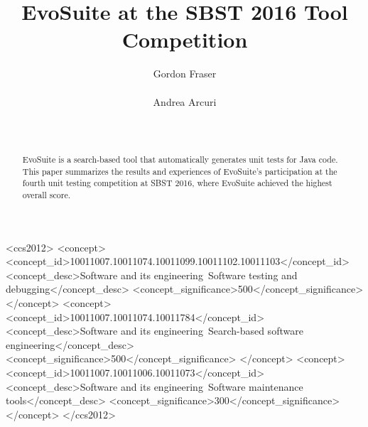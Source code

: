 \documentclass{sig-alternate}
\newcommand{\EVOSUITE}{{\sc EvoSuite}\xspace}
\begin{document}
% 

\title{EvoSuite at the SBST 2016 Tool Competition}
  
\author{
\alignauthor
Gordon Fraser\\
       \\
\alignauthor
 Andrea Arcuri \\
       \\
       \\
}


\maketitle

\begin{abstract}
  \EVOSUITE is a search-based tool that automatically
  generates unit tests for Java code.  This paper summarizes the
  results and experiences of \EVOSUITE's participation at the fourth
  unit testing competition at SBST 2016, where \EVOSUITE achieved the
  highest overall score. 
\end{abstract}

\begin{CCSXML}
<ccs2012>
<concept>
<concept_id>10011007.10011074.10011099.10011102.10011103</concept_id>
<concept_desc>Software and its engineering~Software testing and debugging</concept_desc>
<concept_significance>500</concept_significance>
</concept>
<concept>
<concept_id>10011007.10011074.10011784</concept_id>
<concept_desc>Software and its engineering~Search-based software engineering</concept_desc>
<concept_significance>500</concept_significance>
</concept>
<concept>
<concept_id>10011007.10011006.10011073</concept_id>
<concept_desc>Software and its engineering~Software maintenance tools</concept_desc>
<concept_significance>300</concept_significance>
</concept>
</ccs2012>
\end{CCSXML}


%
%
\printccsdesc
\end{document}
